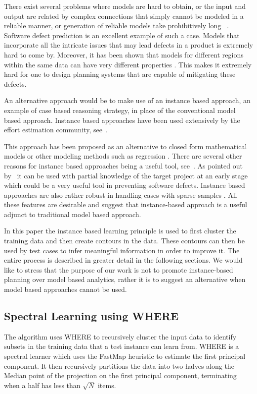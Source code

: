 \documentclass[conference]{IEEEtran}
\begin{document}
There exist several problems where models are hard to obtain, or the input and output are related by complex connections that simply cannot be modeled in a reliable manner, or generation of reliable models take prohibitively long ~\cite{Ludewig2003}. Software defect prediction is an excellent example of such a case. Models that incorporate all the intricate issues that may lead defects in a product is extremely hard to come by. Moreover, it has been shown that models for different regions within the same data can have very different properties \cite{localvsglobal}. This makes it extremely hard for one to design planning systems that are capable of mitigating these defects.

An alternative approach would be to make use of an instance based approach, an example of case based reasoning strategy, in place of the conventional model based approach. Instance based approaches have been used extensively by the effort estimation community, see~\cite{keung2008analogy, 6600685, walkerden1999empirical, shepperd1997estimating, kocaguneli2010use}. 

This approach has been proposed as an alternative to closed form mathematical models or other modeling methods such as regression \cite{keung2008analogy}. There are several other reasons for instance based approaches being a useful tool, see~\cite{6600685}. As pointed out by~\cite{walkerden1999empirical} it can be used with partial knowledge of the target project at an early stage which could be a very useful tool in preventing software defects. Instance based approaches are also rather robust in handling cases with sparse samples \cite{1438374}. All these features are desirable and suggest that instance-based approach is a useful adjunct to traditional model based approach. 

In this paper the instance based learning principle is used to first cluster the training data and then create contours in the data. These contours can then be used by test cases to infer meaningful information in order to improve it. The entire process is described in greater detail in the following sections. We would like to stress that the purpose of our work is not to promote instance-based planning over model based analytics, rather it is to suggest an alternative when model based approaches cannot be used.

\subsection{Spectral Learning using WHERE}
The algorithm uses WHERE to recursively cluster the input data to identify subsets in the training data that a test instance can learn from. WHERE is a spectral learner which uses the FastMap heuristic to estimate the first principal component. It then recursively partitions the data into two halves along the Median point of the projection on the first principal component, terminating when a half has less than $\sqrt{N}$ items.   
\end{document}
